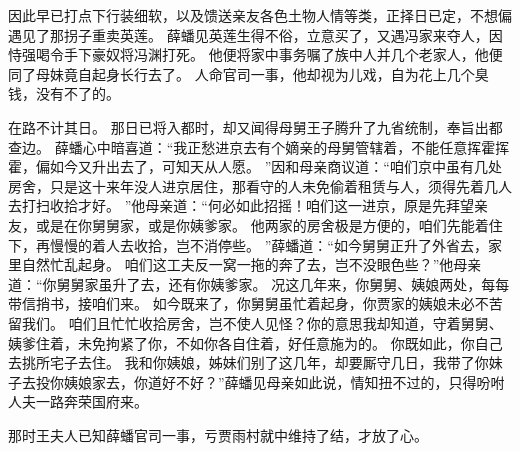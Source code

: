 因此早已打点下行装细软，以及馈送亲友各色土物人情等类，正择日已定，不想偏遇见了那拐子重卖英莲。
薛蟠见英莲生得不俗，立意买了，又遇冯家来夺人，因恃强喝令手下豪奴将冯渊打死。
他便将家中事务嘱了族中人并几个老家人，他便同了母妹竟自起身长行去了。
人命官司一事，他却视为儿戏，自为花上几个臭钱，没有不了的。
\par
在路不计其日。
那日已将入都时，却又闻得母舅王子腾升了九省统制，奉旨出都查边。
薛蟠心中暗喜道：“我正愁进京去有个嫡亲的母舅管辖着，不能任意挥霍挥霍，偏如今又升出去了，可知天从人愿。
”因和母亲商议道：“咱们京中虽有几处房舍，只是这十来年没人进京居住，那看守的人未免偷着租赁与人，须得先着几人去打扫收拾才好。
”他母亲道：“何必如此招摇！咱们这一进京，原是先拜望亲友，或是在你舅舅家，或是你姨爹家。
他两家的房舍极是方便的，咱们先能着住下，再慢慢的着人去收拾，岂不消停些。
”薛蟠道：“如今舅舅正升了外省去，家里自然忙乱起身。
咱们这工夫反一窝一拖的奔了去，岂不没眼色些？”他母亲道：“你舅舅家虽升了去，还有你姨爹家。
况这几年来，你舅舅、姨娘两处，每每带信捎书，接咱们来。
如今既来了，你舅舅虽忙着起身，你贾家的姨娘未必不苦留我们。
咱们且忙忙收拾房舍，岂不使人见怪？你的意思我却知道，守着舅舅、姨爹住着，未免拘紧了你，不如你各自住着，好任意施为的。
你既如此，你自己去挑所宅子去住。
我和你姨娘，姊妹们别了这几年，却要厮守几日，我带了你妹子去投你姨娘家去，你道好不好？”薛蟠见母亲如此说，情知扭不过的，只得吩咐人夫一路奔荣国府来。
\par
那时王夫人已知薛蟠官司一事，亏贾雨村就中维持了结，才放了心。
